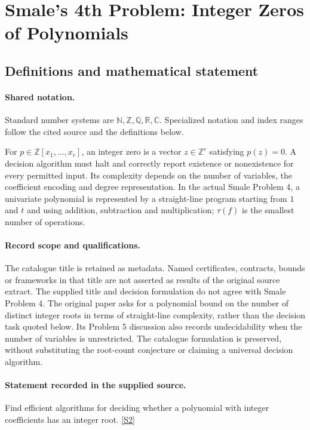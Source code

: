\documentclass[11pt]{article}
\newcommand{\sref}[2]{\hyperlink{source:#1:#2}{[S#2]}}
\begin{document}
\section{Smale's 4th Problem: Integer Zeros of Polynomials}\label{statement}

\subsection{Definitions and mathematical statement}

\paragraph{Shared notation.}Standard number systems are $\mathbb N,\mathbb Z,\mathbb Q,\mathbb R,\mathbb C$. Specialized notation and index ranges follow the cited source and the definitions below.


For $p\in\mathbb Z[x_1,\ldots,x_r]$, an integer zero is a vector $z\in\mathbb Z^r$ satisfying $p(z)=0$. A decision algorithm must halt and correctly report existence or nonexistence for every permitted input. Its complexity depends on the number of variables, the coefficient encoding and degree representation. In the actual Smale Problem 4, a univariate polynomial is represented by a straight-line program starting from $1$ and $t$ and using addition, subtraction and multiplication; $\tau(f)$ is the smallest number of operations.
\paragraph{Record scope and qualifications.}
The catalogue title is retained as metadata. Named certificates, contracts, bounds or frameworks in that title are not asserted as results of the original source extract.
The supplied title and decision formulation do not agree with Smale Problem 4. The original paper asks for a polynomial bound on the number of distinct integer roots in terms of straight-line complexity, rather than the decision task quoted below. Its Problem 5 discussion also records undecidability when the number of variables is unrestricted. The catalogue formulation is preserved, without substituting the root-count conjecture or claiming a universal decision algorithm.
\paragraph{Statement recorded in the supplied source.}
Find efficient algorithms for deciding whether a polynomial with integer coefficients has an integer root. \sref{statement}{2}
\end{document}
